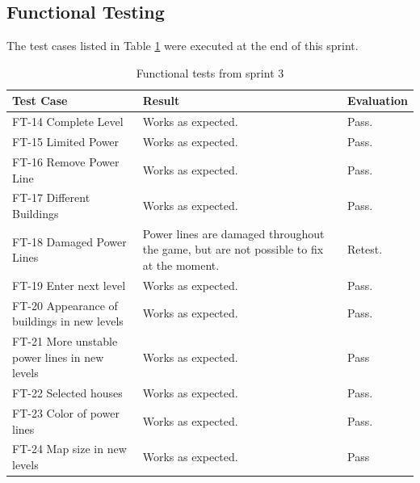 \subsection{Functional Testing}

	The test cases listed in Table \ref{table:testssprint3} were executed at the end of this sprint.


	\begin{table}[H]
	\begin{tabular}{| p{3cm} | p{6.5cm} | p{2.5cm} |}
		\hline
		\rowcolor{lightgray}
		{\bf Test Case} & {\bf Result} & {\bf Evaluation} \\ \hline

	  	FT-14 Complete Level & Works as expected. & Pass. \\ \hline
	  	
	  	FT-15 Limited Power & Works as expected. & Pass. \\ \hline
	  	
	  	FT-16 Remove Power Line & Works as expected. & Pass. \\ \hline
	  		  	
	  	FT-17 Different Buildings & Works as expected. & Pass. \\ \hline

	  	FT-18 Damaged Power Lines & Power lines are damaged throughout the game, but are not possible 
	  	to fix at the moment. & Retest. \\ \hline
	  	
	  	FT-19 Enter next level & Works as expected. & Pass. \\ \hline

	  	FT-20 Appearance of buildings in new levels & Works as expected. & Pass. \\ \hline

	  	FT-21 More unstable power lines in new levels & Works as expected. & Pass \\ \hline

	  	FT-22 Selected houses & Works as expected. & Pass. \\ \hline

	  	FT-23 Color of power lines & Works as expected. & Pass. \\ \hline
	  	FT-24 Map size in new levels & Works as expected. & Pass \\ \hline

	\end{tabular}
	\caption{Functional tests from sprint 3}
	\label{table:testssprint3}
	\end{table}

